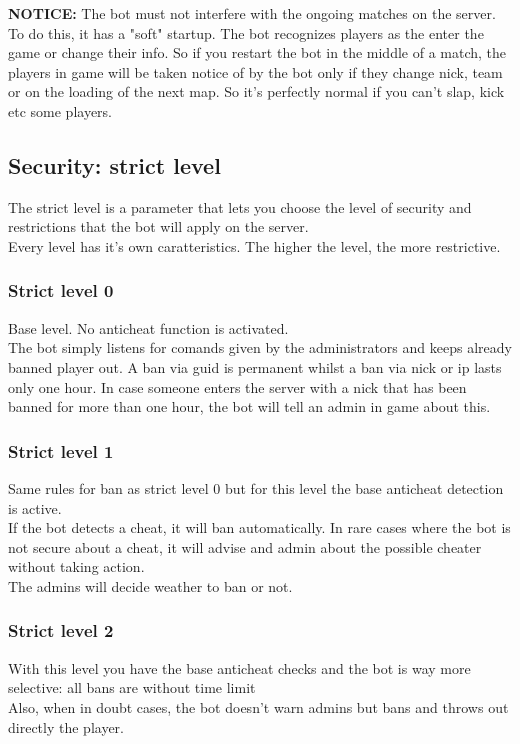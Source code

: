 \documentclass[a4paper]{article}
\begin{document}
\textbf{NOTICE:}
The bot must not interfere with the ongoing matches on the server. To do this, it has a "soft" startup.
The bot recognizes players as the enter the game or change their info. So if you restart the bot in the middle of a match,
the players in game will be taken notice of by the bot only if they change nick, team or on the loading of the next map.
So it's perfectly normal if you can't slap, kick etc some players.

\newpage
\subsection{Security: strict level}
The strict level is a parameter that lets you choose the level of security and restrictions that the bot will apply on the server.\\
Every level has it's own caratteristics. The higher the level, the more restrictive.

\subsubsection{Strict level 0}
Base level. No anticheat function is activated.\\
The bot simply listens for comands given by the administrators and keeps already banned player out.
A ban via guid is permanent whilst a ban via nick or ip lasts only one hour. In case someone enters the server with a nick that has been
banned for more than one hour, the bot will tell an admin in game about this.

\subsubsection{Strict level 1}
Same rules for ban as strict level 0 but for this level the base anticheat detection is active.\\
If the bot detects a cheat, it will ban automatically. In rare cases where the bot is not secure about a cheat, it will advise and admin
about the possible cheater without taking action.\\
The admins will decide weather to ban or not.

\subsubsection{Strict level 2}
With this level you have the base anticheat checks and the bot is way more selective: all bans are without time limit\\
Also, when in doubt cases, the bot doesn't warn admins but bans and throws out directly the player.
\end{document}
